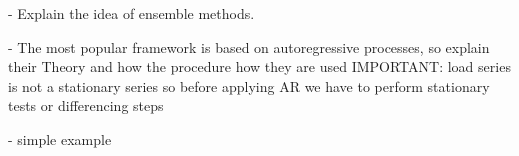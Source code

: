 - Explain the idea of ensemble methods.

- The most popular framework is based on
autoregressive processes, so explain their Theory
and how the procedure how they are used
IMPORTANT: load series is not a stationary series so before applying AR we have to perform stationary tests or differencing steps

- simple example